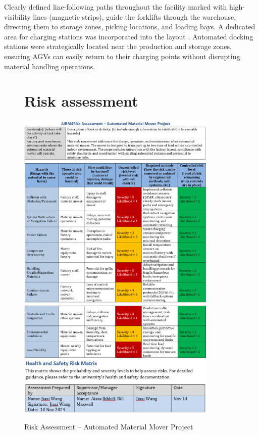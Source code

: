 \documentclass[12pt]{article}
\begin{document}
Clearly defined line-following paths throughout the facility marked with high-visibility lines (magnetic strips), guide the forklifts through the warehouse, directing them to storage zones, picking locations, and loading bays. A dedicated area for charging stations was incorporated into the layout . Automated docking stations were strategically located near the production and storage zones, ensuring AGVs can easily return to their charging points without disrupting material handling operations. 

 

 
\begin{figure}[h!]
 \section{Risk assessment }
    \centering
    \includegraphics[width=0.85\textwidth]{Risk1.png}
    \includegraphics[width=0.85\textwidth]{Risk2.png}
    \includegraphics[width=0.85\textwidth]{Risk3.png}
    \includegraphics[width=0.85\textwidth]{Risk4.png}
    \caption{Risk Assessment – Automated Material Mover Project}
    \label{fig:risk_assessment}
\end{figure}
\FloatBarrier
\end{document}
